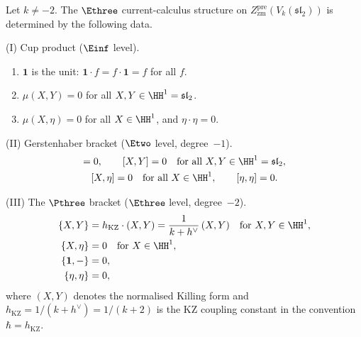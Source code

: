 \begin{proposition}
\label{prop:e3-explicit-sl2}
\ClaimStatusConditional
Let $k \neq -2$.
The $\Ethree$ current-calculus structure on
$Z^{\mathrm{pre}}_{\mathrm{zm}}(V_k(\mathfrak{sl}_2))$
is determined by the following data.

\smallskip
\noindent
\textup{(I) Cup product} ($\Einf$ level).
\begin{enumerate}[label=\textup{(\alph*)}]
\item $\mathbf{1}$ is the unit:
 $\mathbf{1} \cdot f = f \cdot \mathbf{1} = f$ for all $f$.
\item
 $\mu(X, Y) = 0$ for all $X, Y \in \HH^1 = \mathfrak{sl}_2$.
\item
 $\mu(X, \eta) = 0$ for all $X \in \HH^1$, and
 $\eta \cdot \eta = 0$.
\end{enumerate}

\smallskip
\noindent
\textup{(II) Gerstenhaber bracket} ($\Etwo$ level,
degree~$-1$).
\begin{gather*}
 [\mathbf{1}, -] = 0, \qquad
 [X, Y] = 0 \quad \text{for all }
 X, Y \in \HH^1 = \mathfrak{sl}_2, \\
 [X, \eta] = 0 \quad \text{for all } X \in \HH^1,
 \qquad [\eta, \eta] = 0.
\end{gather*}

\smallskip
\noindent
\textup{(III) The $\Pthree$ bracket} ($\Ethree$ level,
degree~$-2$).
\begin{align}
 \label{eq:e3-p3-killing}
 \{X, Y\}
 &= h_{\mathrm{KZ}} \cdot (X, Y)
 = \frac{1}{k + h^\vee}\,(X, Y)
 \quad \text{for } X, Y \in \HH^1,
 \\
 \label{eq:e3-p3-derivation}
 \{X, \eta\}
 &= 0
 \quad \text{for } X \in \HH^1,
 \\
 \label{eq:e3-p3-unit}
 \{\mathbf{1}, -\}
 &= 0,
 \\
 \label{eq:e3-p3-top}
 \{\eta, \eta\}
 &= 0,
\end{align}
where $(X, Y)$ denotes the normalised Killing form
and $h_{\mathrm{KZ}} = 1/(k + h^\vee) = 1/(k + 2)$ is
the KZ coupling constant in the convention
$\hbar = h_{\mathrm{KZ}}$.
\end{proposition}

